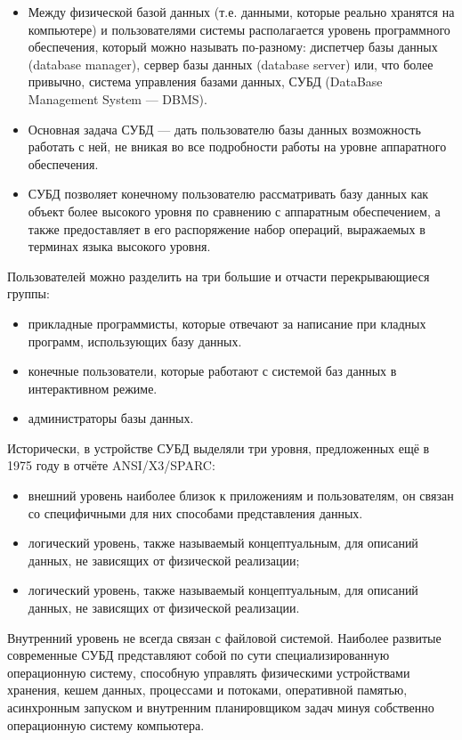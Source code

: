 \documentclass{beamer}
\begin{document}
\begin{frame}
\begin{itemize}
\item Между физической базой данных (т.е. данными, которые реально хранятся на компьютере) и пользователями системы располагается уровень программного обеспечения, который можно называть по-разному: диспетчер базы данных (database manager), сервер базы данных (database server) или, что более привычно, система управления базами данных, СУБД (DataBase Management System — DBMS).
\item Основная задача СУБД — дать пользователю базы данных возможность работать с ней, не вникая во все подробности работы на уровне аппаратного обеспечения. 
\item СУБД позволяет конечному пользователю рассматривать базу данных как объект более высокого уровня по сравнению с аппаратным обеспечением, а также предоставляет в его распоряжение набор операций, выражаемых в терминах языка высокого уровня.
\end{itemize}
\end{frame}

\begin{frame}
Пользователей можно разделить на три большие и отчасти перекрывающиеся группы:
\begin{itemize}
\item прикладные программисты, которые отвечают за написание при кладных программ, использующих базу данных.
\item конечные пользователи, которые работают с системой баз данных в интерактивном режиме. 
\item  администраторы базы данных.
\end{itemize}
\end{frame}

\begin{frame}
Исторически, в устройстве СУБД выделяли три уровня, предложенных ещё в 1975 году в отчёте ANSI/X3/SPARC:
\begin{itemize}
\item внешний уровень наиболее близок к приложениям и пользователям, он связан со специфичными для них способами представления данных.
\item логический уровень, также называемый концептуальным, для описаний данных, не зависящих от физической реализации; 
\item логический уровень, также называемый концептуальным, для описаний данных, не зависящих от физической реализации.
\end{itemize}
Внутренний уровень не всегда связан с файловой системой. Наиболее развитые современные СУБД представляют собой по сути специализированную операционную систему, способную управлять
физическими устройствами хранения, кешем данных, процессами и потоками, оперативной памятью, асинхронным запуском и внутренним планировщиком задач минуя собственно операционную систему
компьютера.
\end{frame}
\end{document}
